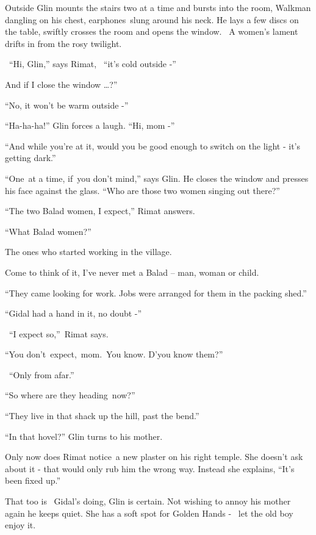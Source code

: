 \documentclass[12pt]{book}
\begin{document}
{Outside Glin }mounts the stairs
{two at a time and bursts into the room, Walkman dangling on his
chest, earphones~}slung{ around his neck. He lays a few discs on the
table, swiftly crosses the room and opens the window.~ A women's lament drifts in from the rosy twilight.}

{\ {}``}Hi,{ Glin,''
says Rimat, \ {}``it's cold outside -''}

{\textquotedbl}And if I{ close the window {\dots}?''}

{{}``No, it won't be warm outside -''}

{{}``Ha-ha-ha!'' Glin }forces a
laugh{. ``Hi, mom -'' }

{{}``And while you're at it, }would you be good enough to switch on the
light - {it's getting dark.''}

{{}``One~at a time, if~you }don't
mind{,'' says Glin. He closes the window and presses his face against
the glass}.{ ``Who are those
}two{ }{women singing out
there?''}

{{}``The two Balad women, I
}expect{,'' Rimat answers.}

{{}``What Balad women?''}

{\textquotedbl}The ones who started working{ in the
village.{\textquotedbl}\ \ \ \ \ \ \ \ }

{{\textquotedbl}Come to think of it, I've never met a Balad -- man,
woman }or child.{\textquotedbl}

{{}``They came looking for work. Jobs were arranged for them in the
packing }shed{.''}

{{}``Gidal had a hand in it, no doubt -''}

{~``}I expect
so{,''~Rimat says. }

{{}``You
don't~}expect,~mom{.~You know.
}D'y{ou know them?''}

{~``Only from afar.''}

{{}``So where are they heading~now?''}

{{}``They live in that shack up the hill,
}past{ the bend.''}

{{}``In that hovel?'' Glin turns }to his
mother{.}

{Only now does Rimat notice~a new }plaster
{on his right temple. She doesn't ask about
it}{ }{}- that would only rub him the wrong
way{. Instead she explains, ``It's been fixed up.''}

{That too is \ Gidal's doing, Glin is certain. Not wishing to annoy his
}mother{ again he keeps quiet. She has a soft spot for Golden Hands -
\ let the }old boy {enjoy it.}
\end{document}
